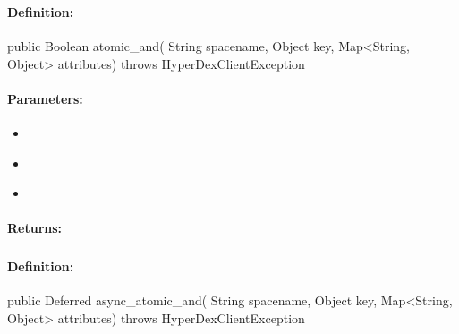 \subsubsection{}
\label{api:java:atomic_and}


\paragraph{Definition:}
\begin{javacode}
public Boolean atomic_and(
        String spacename,
        Object key,
        Map<String, Object> attributes) throws HyperDexClientException
\end{javacode}

\paragraph{Parameters:}
\begin{itemize}[noitemsep]
\item {}\\

\item {}\\

\item {}\\

\end{itemize}

\paragraph{Returns:}


\pagebreak
\subsubsection{}
\label{api:java:async_atomic_and}


\paragraph{Definition:}
\begin{javacode}
public Deferred async_atomic_and(
        String spacename,
        Object key,
        Map<String, Object> attributes) throws HyperDexClientException
\end{javacode}

